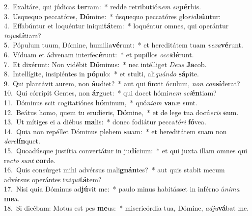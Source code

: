 {2.~}Exaltáre, qui júdicas \textbf{ter}ram:~* redde retributió\textit{nem} \textit{su}\textbf{pér}bis.\\
{3.~}Usquequo peccatóres, \textbf{Dó}mine:~* úsquequo peccatóres glo\textit{ri}\textit{a}\textbf{bún}tur:\\
{4.~}Effabúntur et loquéntur iniqui\textbf{tá}tem:~* loquéntur omnes, qui operántur \textit{in}\textit{ju}\textbf{stí}tiam?\\
{5.~}Pópulum tuum, Dómine, humilia\textbf{vé}runt:~* et hereditátem tuam \textit{ve}\textit{xa}\textbf{vé}runt.\\
{6.~}Víduam et ádvenam interfe\textbf{cé}runt:~* et pupíllos \textit{oc}\textit{ci}\textbf{dé}runt.\\
{7.~}Et dixérunt: Non vidébit \textbf{Dó}minus:~* nec intélliget \textit{De}\textit{us} \textbf{Ja}cob.\\
{8.~}Intellígite, insipiéntes in \textbf{pó}pulo:~* et stulti, ali\textit{quán}\textit{do} \textbf{sá}pite.\\
{9.~}Qui plantávit aurem, non \textbf{áu}diet?~* aut qui finxit óculum, \textit{non} \textit{con}\textbf{sí}derat?\\
{10.~}Qui córripit Gentes, non \textbf{ár}guet:~* qui docet hómi\textit{nem} \textit{sci}\textbf{én}tiam?\\
{11.~}Dóminus scit cogitatiónes \textbf{hó}minum,~* quó\textit{ni}\textit{am} \textbf{va}næ sunt.\\
{12.~}Beátus homo, quem tu erudíeris, \textbf{Dó}mine,~* et de lege tua docú\textit{e}\textit{ris} \textbf{e}um.\\
{13.~}Ut mítiges ei a diébus \textbf{ma}lis:~* donec fodiátur pecca\textit{tó}\textit{ri} \textbf{fó}vea.\\
{14.~}Quia non repéllet Dóminus plebem \textbf{su}am:~* et hereditátem suam non \textit{de}\textit{re}\textbf{lín}quet.\\
{15.~}Quoadúsque justítia convertátur in ju\textbf{dí}cium:~* et qui juxta illam omnes qui re\textit{cto} \textit{sunt} \textbf{cor}de.\\
{16.~}Quis consúrget mihi advérsus mali\textbf{gnán}tes?~* aut quis stabit mecum advérsus operántes i\textit{ni}\textit{qui}\textbf{tá}tem?\\
{17.~}Nisi quia Dóminus ad\textbf{jú}vit me:~* paulo minus habitásset in inférno á\textit{ni}\textit{ma} \textbf{me}a.\\
{18.~}Si dicébam: Motus est pes \textbf{me}us:~* misericórdia tua, Dómine, \textit{ad}\textit{ju}\textbf{vá}bat me.\\
